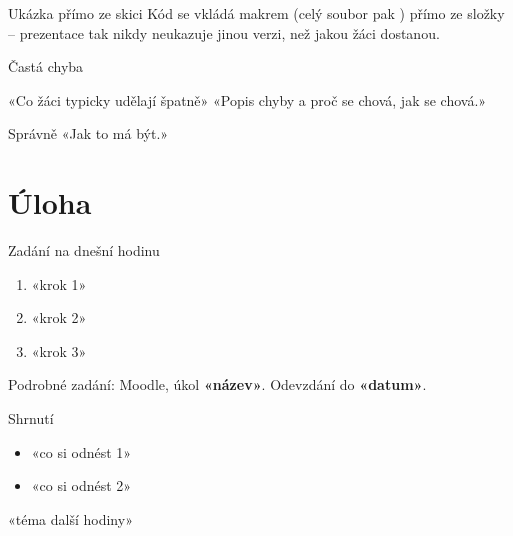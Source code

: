 \documentclass[12pt,aspectratio=169]{beamer}
\begin{document}
\begin{frame}[fragile]{Ukázka přímo ze skici}
  \small
  Kód se vkládá makrem 
  (celý soubor pak ) přímo ze složky
   -- prezentace tak nikdy neukazuje jinou verzi, než jakou žáci
  dostanou.
\end{frame}

\begin{frame}{Častá chyba}
  \begin{alertblock}{«Co žáci typicky udělají špatně»}
    «Popis chyby a proč se chová, jak se chová.»
  \end{alertblock}
  \begin{exampleblock}{Správně}
    «Jak to má být.»
  \end{exampleblock}
\end{frame}

\section{Úloha}

\begin{frame}{Zadání na dnešní hodinu}
  \begin{enumerate}
    \item «krok 1»
    \item «krok 2»
    \item «krok 3»
  \end{enumerate}
  \vfill
  \small Podrobné zadání: Moodle, úkol \textbf{«název»}. Odevzdání do \textbf{«datum»}.
\end{frame}

\begin{keyframe}{Shrnutí}
  \begin{itemize}
    \item «co si odnést 1»
    \item «co si odnést 2»
  \end{itemize}
  \vfill
   «téma další hodiny»
\end{keyframe}
\end{document}
